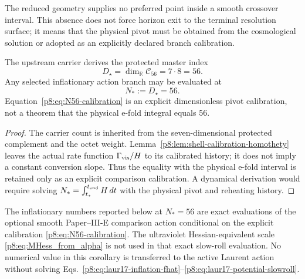 \documentclass[12pt,a4paper]{article}
\begin{document}
\begin{remark}
\label{p8:lem:no-interior-horizon-exit-selector}
The reduced geometry supplies no preferred point inside a smooth crossover interval.  This absence does not force horizon exit to the terminal resolution surface; it means that the physical pivot must be obtained from the cosmological solution or adopted as an explicitly declared branch calibration.
\end{remark}

\begin{theorem}
\label{p8:thm:N56-exact-count}
The upstream carrier derives the protected master index
\[
D_\star=\dim_{\mathbb R}\mathcal C_{56}=7\cdot8=56.
\]
Any selected inflationary action branch may be evaluated at
\begin{equation}
\label{p8:eq:N56-calibration}
N_*:=D_\star=56.
\end{equation}
Equation~\eqref{p8:eq:N56-calibration} is an explicit dimensionless pivot calibration, not a theorem that the physical e-fold integral equals 56.
\end{theorem}

\begin{proof}
The carrier count is inherited from the seven-dimensional protected complement and the octet weight.  Lemma~\ref{p8:lem:shell-calibration-homothety} leaves the actual rate function $\Gamma_{\rm vis}/H$ to its calibrated history; it does not imply a constant conversion slope. Thus the equality with the physical e-fold interval is retained only as an explicit comparison calibration.  A dynamical derivation would require solving \(N_*=\int_{t_*}^{t_{\rm end}}H\,dt\) with the physical pivot and reheating history.
\end{proof}

\begin{corollary}
\label{p8:cor:inflationary-count-master-index}
The inflationary numbers reported below at \(N_*=56\) are exact evaluations
of the optional smooth Paper--III-E comparison action conditional on the explicit
calibration \eqref{p8:eq:N56-calibration}.  The ultraviolet Hessian-equivalent
scale \eqref{p8:eq:MHess_from_alpha} is not used in that exact slow-roll
evaluation.  No numerical value in this corollary is transferred to the
active Laurent action without solving
Eqs.~\eqref{p8:eq:laur17-inflation-fhat}--\eqref{p8:eq:laur17-potential-slowroll}.
\end{corollary}
\end{document}
